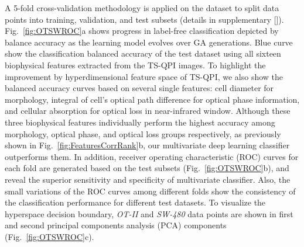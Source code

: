 \documentclass[aps,pra,reprint,longbibliography,superscriptaddress]{revtex4-1}
\begin{document}
A 5-fold cross-validation methodology is applied on the dataset to split data points into training, validation, and test subsets (details in supplementary []). Fig.~\ref{fig:OTSWROC}a shows progress in label-free classification depicted by balance accuracy as the learning model evolves over GA generations. Blue curve show the classification balanced accuracy of the test dataset using all sixteen biophysical features extracted from the TS-QPI images. To highlight the improvement by hyperdimensional feature space of TS-QPI, we also show the balanced accuracy curves based on several single features: cell diameter for morphology, integral of cell's optical path difference for optical phase information, and cellular absorption for optical loss in near-infrared window. Although these three biophysical features individually perform the highest accuracy among morphology, optical phase, and optical loss groups respectively, as previously shown in Fig.~\ref{fig:FeaturesCorrRank}b, our multivariate deep learning classifier outperforms them. In addition, receiver operating characteristic (ROC) curves for each fold are generated based on the test subsets (Fig.~\ref{fig:OTSWROC}b), and reveal the superior sensitivity and specificity of multivariate classifier. Also, the small variations of the ROC curves among different folds show the consistency of the classification performance for different test datasets. To visualize the hyperspace decision boundary, \textit{OT-II} and \textit{SW-480} data points are shown in first and second principal components analysis (PCA) components (Fig.~\ref{fig:OTSWROC}c).
\end{document}
